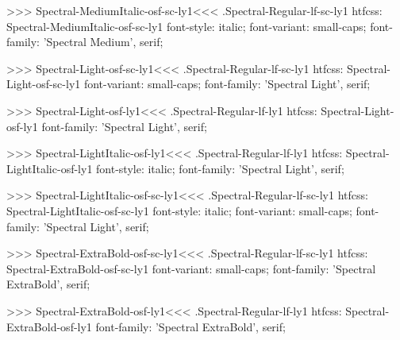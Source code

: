 >>>
\<Spectral-MediumItalic-osf-sc-ly1\><<<
.Spectral-Regular-lf-sc-ly1
htfcss:  Spectral-MediumItalic-osf-sc-ly1  font-style: italic; font-variant: small-caps; font-family: 'Spectral Medium', serif;

>>>
\<Spectral-Light-osf-sc-ly1\><<<
.Spectral-Regular-lf-sc-ly1
htfcss:  Spectral-Light-osf-sc-ly1  font-variant: small-caps; font-family: 'Spectral Light', serif;

>>>
\<Spectral-Light-osf-ly1\><<<
.Spectral-Regular-lf-ly1
htfcss:  Spectral-Light-osf-ly1  font-family: 'Spectral Light', serif;

>>>
\<Spectral-LightItalic-osf-ly1\><<<
.Spectral-Regular-lf-ly1
htfcss:  Spectral-LightItalic-osf-ly1  font-style: italic; font-family: 'Spectral Light', serif;

>>>
\<Spectral-LightItalic-osf-sc-ly1\><<<
.Spectral-Regular-lf-sc-ly1
htfcss:  Spectral-LightItalic-osf-sc-ly1  font-style: italic; font-variant: small-caps; font-family: 'Spectral Light', serif;

>>>
\<Spectral-ExtraBold-osf-sc-ly1\><<<
.Spectral-Regular-lf-sc-ly1
htfcss:  Spectral-ExtraBold-osf-sc-ly1  font-variant: small-caps; font-family: 'Spectral ExtraBold', serif;

>>>
\<Spectral-ExtraBold-osf-ly1\><<<
.Spectral-Regular-lf-ly1
htfcss:  Spectral-ExtraBold-osf-ly1  font-family: 'Spectral ExtraBold', serif;

